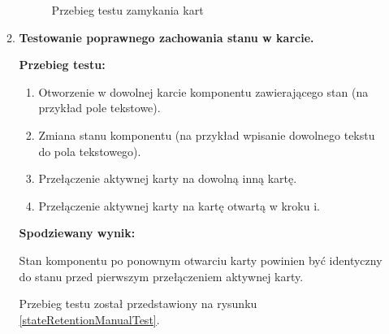 \begin{enumerate}
\begin{enumerate}
\begin{figure}[h]

                    \caption{Przebieg testu zamykania kart}
                    \label{cardClosingManualTest}
                \end{figure}

                \FloatBarrier

            \item \textbf{Testowanie poprawnego zachowania stanu w karcie.}

                \textbf{Przebieg testu:}

                \begin{enumerate}

                    \item Otworzenie w dowolnej karcie komponentu zawierającego
                        stan (na przykład pole tekstowe).

                    \item Zmiana stanu komponentu (na przykład wpisanie dowolnego
                        tekstu do pola tekstowego).

                    \item Przełączenie aktywnej karty na dowolną inną kartę.

                    \item Przełączenie aktywnej karty na kartę otwartą w kroku
                        i.

                \end{enumerate}

                \textbf{Spodziewany wynik:}

                Stan komponentu po ponownym otwarciu karty powinien być
                identyczny do stanu przed pierwszym przełączeniem aktywnej
                karty.

                Przebieg testu został przedstawiony na rysunku \ref{stateRetentionManualTest}.

                \begin{figure}[h]
                    \centering


\end{figure}
\end{enumerate}
\end{enumerate}
